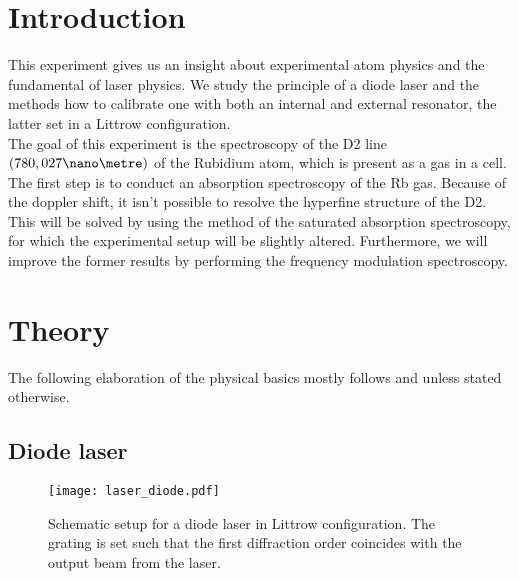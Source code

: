 
\section{Introduction}
This experiment gives us an insight about experimental atom physics and the fundamental of laser physics. We study the principle of a diode laser and the methods how to calibrate one with both an internal and external resonator, the latter set in a Littrow configuration.\\
The goal of this experiment is the spectroscopy of the D2 line $(780,027 \nano\metre)$ of the Rubidium atom, which is present as a gas in a cell.\\
The first step is to conduct an absorption spectroscopy of the Rb gas. Because of the doppler shift, it isn't possible to resolve the hyperfine structure of the D2. This will be solved by using the method of the saturated absorption spectroscopy, for which the experimental setup will be slightly altered. Furthermore, we will improve the former results by performing the frequency modulation spectroscopy.

\newpage
\section{Theory}
The following elaboration of the physical basics mostly follows \cite{lit:AK_manual2012} and \cite{lit:SAS} unless stated otherwise.

\subsection{Diode laser}
\begin{figure}[bh]
	\centering
	\texttt{[image: laser\_diode.pdf]}
	\caption[Schematic setup for a diode laser in Littrow configuration]{Schematic setup for a diode laser in Littrow configuration. The grating is set such that the first diffraction order coincides with the output beam from the laser.}
	\label{fig:laser_diode}
\end{figure}

